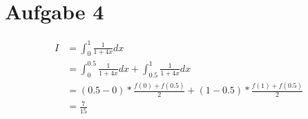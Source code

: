 \section*{Aufgabe 4}

\begin{align*}
	I &= \int_0^1 \frac{1}{1+4x} dx\\
    &= \int_0^{0.5} \frac{1}{1+4x} dx +\int_{0.5}^{1} \frac{1}{1+4x} dx\\
    &= (0.5 - 0) * \frac{f(0) + f(0.5)}{2} + (1 - 0.5) * \frac{f(1) + f(0.5)}{2} \\
    &= \frac{7}{15}
\end{align*}
